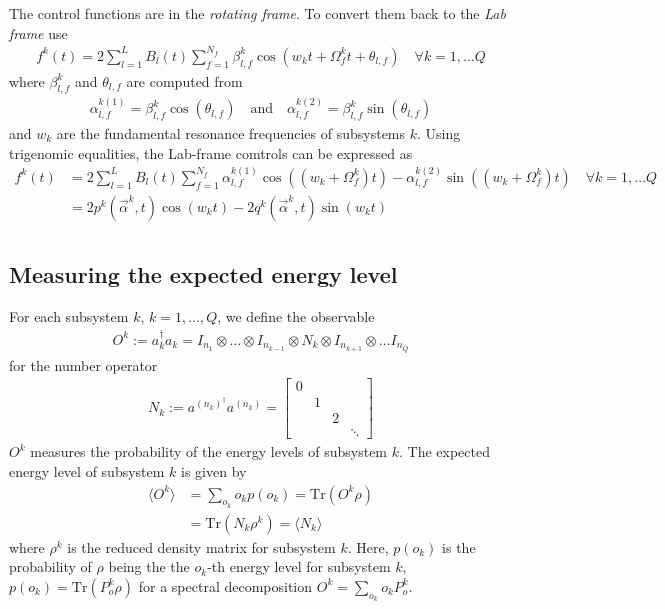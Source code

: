 \documentclass[letterpaper]{article}
\begin{document}
The control functions are in the \textit{rotating frame}. To convert them back
to the \textit{Lab frame} use
\begin{align}
  f^k(t) = 2 \sum_{l=1}^L B_l(t) \sum_{f=1}^{N_f} \beta_{l,f}^k \cos(w_k t +
  \Omega_f^k t + \theta_{l,f}) \quad \forall k=1,\dots Q
\end{align}
where $\beta_{l,f}^k$ and $\theta_{l,f}$ are computed from
\begin{align}
  \alpha_{l,f}^{k(1)} = \beta_{l,f}^k \cos(\theta_{l,f}) \quad \text{and} \quad
  \alpha_{l,f}^{k(2)} = \beta_{l,f}^k \sin(\theta_{l,f})
\end{align}
and $w_k$ are the fundamental resonance frequencies of subsystems $k$. Using
trigenomic equalities, the Lab-frame comtrols can be expressed as
\begin{align}
  f^k(t) &= 2 \sum_{l=1}^L B_l(t) \sum_{f=1}^{N_f} \alpha_{l,f}^{k(1)} \cos((w_k
  + \Omega_f^k) t) - \alpha_{l,f}^{k(2)}\sin((w_k + \Omega_f^k) t) \quad \forall
  k=1,\dots Q \\
         &= 2 p^k(\vec{\alpha}^k, t) \cos(w_k t) - 2 q^k(\vec{\alpha}^k,
         t)\sin(w_k t) \\
\end{align}


\subsection{Measuring the expected energy level}\label{sec:expectedenergy}
For each subsystem $k$, $k=1,\dots, Q$, we define the observable 
\begin{align}
  O^k := a_k^\dag a_k  = I_{n_1} \otimes \dots \otimes I_{n_{k-1}} \otimes  N_k
  \otimes I_{n_{k+1}} \otimes \dots I_{n_Q} 
\end{align}
for the number operator 
\begin{align}
  N_k := a^{(n_k)^\dag} a^{(n_k)} = \begin{bmatrix} 
   0 &    &    & \\
     &  1 &    &\\
     &    &  2 &\\
     &    &    & \ddots 
  \end{bmatrix}
\end{align}
$O^k$ measures the probability of the energy levels of subsystem $k$. The
expected energy level of subsystem $k$ is given by 
\begin{align}
  \langle O^k \rangle &= \sum_{o_k} o_k p(o_k)  = \mbox{Tr}(O^k\rho) \\
   & = \mbox{Tr}(N_k \rho^k)  = \langle N_k\rangle
\end{align}
where $\rho^k$ is the reduced density matrix for subsystem $k$. Here, $p(o_k)$
is the probability of $\rho$ being the the $o_k$-th energy level for subsystem
$k$, $p(o_k) = \mbox{Tr}(P^k_o \rho)$ for a spectral decomposition $O^k =
\sum_{o_k} o_kP^k_o$. 
\end{document}
